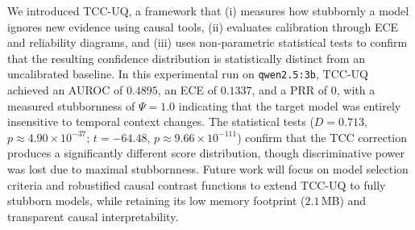 \documentclass[twoside]{article}
\begin{document}
We introduced TCC-UQ, a framework that (i) measures how stubbornly a
model ignores new evidence using causal tools, (ii) evaluates
calibration through ECE and reliability diagrams, and (iii) uses
non-parametric statistical tests to confirm that the resulting
confidence distribution is statistically distinct from an uncalibrated
baseline. In this experimental run on \texttt{qwen2.5:3b}, TCC-UQ
achieved an AUROC of $0.4895$, an ECE of $0.1337$, and a PRR of $0$,
with a measured stubbornness of $\Psi = 1.0$ indicating that the target
model was entirely insensitive to temporal context changes. The
statistical tests ($D = 0.713$, $p \approx 4.90\times10^{-37}$;
$t = -64.48$, $p \approx 9.66\times10^{-111}$) confirm that the TCC
correction produces a significantly different score distribution, though
discriminative power was lost due to maximal stubbornness. Future work
will focus on model selection criteria and robustified causal contrast
functions to extend TCC-UQ to fully stubborn models, while retaining its
low memory footprint ($2.1$\,MB) and transparent causal interpretability.
\end{document}
